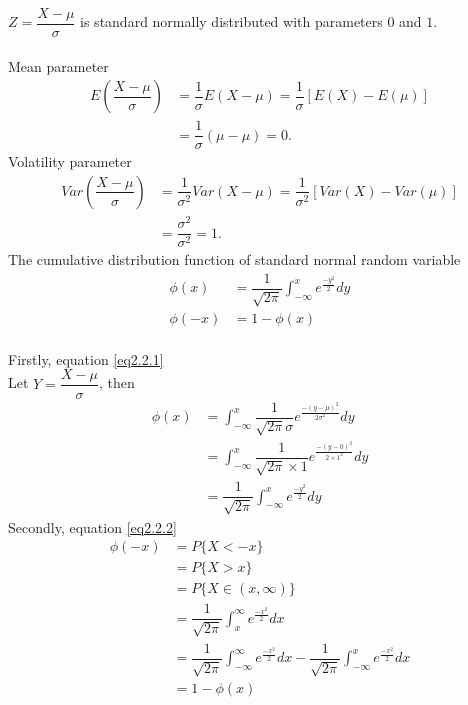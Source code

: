 $Z=\dfrac{X-\mu}{\sigma}$ is standard normally distributed with parameters $0$ and $1$.\\[0.5cm]
\\[0.5cm]
Mean parameter
\begin{align*}
	E\left(\dfrac{X-\mu}{\sigma}\right) &=\dfrac{1}{\sigma}E(X-\mu)=\dfrac{1}{\sigma}[E(X)-E(\mu)]\\
	&=\dfrac{1}{\sigma}(\mu - \mu)=0.
\end{align*}
Volatility parameter
\begin{align*}
	Var\left(\dfrac{X-\mu}{\sigma}\right)
	&=\dfrac{1}{\sigma^2}Var(X-\mu)=\dfrac{1}{\sigma^2}[Var(X)-Var(\mu)]\\
	&=\dfrac{\sigma^2}{\sigma^2}=1.		
\end{align*}
The cumulative distribution function of standard normal random variable
\begin{align}
	\phi(x)&=\dfrac{1}{\sqrt{2\pi}} \displaystyle \int_{-\infty}^{x}e^\frac{-y^2}{2}dy \label{eq2.2.1} \\
	\phi(-x)&=1-\phi(x) \label{eq2.2.2}
\end{align}
\\[0.5cm]
\indent Firstly, equation \eqref{eq2.2.1}\\
\indent Let $Y=\dfrac{X-\mu}{\sigma}$, then
\begin{align*}
	\phi(x)&=\displaystyle\int_{-\infty}^{x}\dfrac{1}{\sqrt{2\pi}\sigma}e^\frac{-(y-\mu)^2}{2\sigma^2}dy\\
	&=\displaystyle\int_{-\infty}^{x}\dfrac{1}{\sqrt{2\pi}\times1}e^\frac{-(y-0)^2}{2\times1^2}dy\\
	&=\dfrac{1}{\sqrt{2\pi}} \displaystyle \int_{-\infty}^{x}e^\frac{-y^2}{2}dy
\end{align*}
Secondly, equation \eqref{eq2.2.2} 
\begin{align*}
	\phi(-x)&=P\{X< -x\}\\
	&=P\{X> x\}\\
	&=P\{X\in (x,\infty)\}\\
	&=\dfrac{1}{\sqrt{2\pi}} \displaystyle \int_{x}^{\infty}e^\frac{-x^2}{2}dx\\
	&=\dfrac{1}{\sqrt{2\pi}} \displaystyle \int_{-\infty}^{\infty}e^\frac{-x^2}{2}dx - \dfrac{1}{\sqrt{2\pi}} \displaystyle \int_{-\infty}^{x}e^\frac{-x^2}{2}dx\\
	&=1 - \phi(x)
\end{align*}

